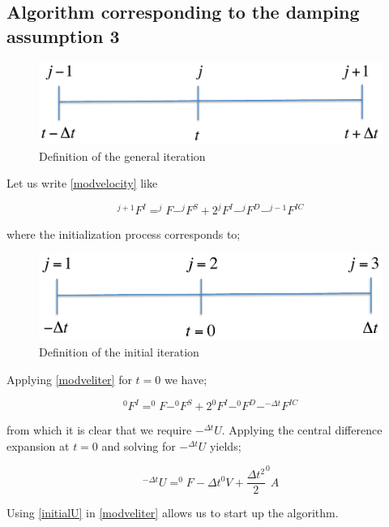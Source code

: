 \subsection{Algorithm corresponding to the damping assumption 3}

\begin{figure}[h]
\centering
\includegraphics[width=12cm]{img/figure5.pdf}
\caption{Definition of the general iteration}
\label{fig:general iteration}
\end{figure}

Let us write \eqref{modvelocity} like

\begin{equation}
^{j+1}F^I=^{j}F-^{j}F^S+2 ^{j}F^{I}-^{j}F^D-^{j-1}F^{IC}
\label{modveliter}
\end{equation}

where the initialization process corresponds to;


\begin{figure}[h]
\centering
\includegraphics[width=12cm]{img/figure6.pdf}
\caption{Definition of the initial iteration}
\label{fig:initial iteration}
\end{figure}

Applying \eqref{modveliter} for $t=0$ we have;

\[
^{0}F^I=^{0}F-^{0}F^S+2 ^{0}F^{I}-^{0}F^D-^{-\Delta t}F^{IC}
\]

from which it is clear that we require $-^{\Delta t}U$. Applying the central difference expansion at $t=0$ and solving for $-^{\Delta t}U$ yields;

\begin{equation}
^{-\Delta t}U=^{0}F-\Delta t ^{0}V+\dfrac{\Delta t^2}{2} ^{0}A
\label{initialU}
\end{equation}

Using \eqref{initialU} in \eqref{modveliter} allows us to start up the algorithm.

